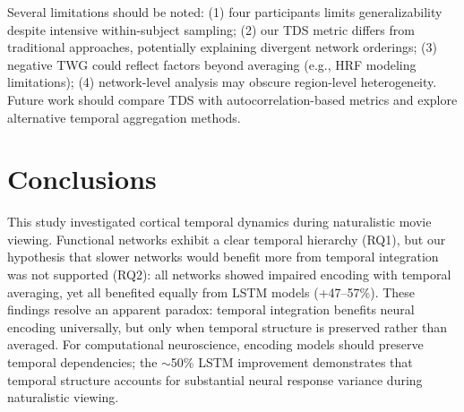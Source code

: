 \documentclass[10pt,letterpaper]{article}
\begin{document}
Several limitations should be noted: (1) four participants limits generalizability despite intensive within-subject sampling; (2) our TDS metric differs from traditional approaches, potentially explaining divergent network orderings; (3) negative TWG could reflect factors beyond averaging (e.g., HRF modeling limitations); (4) network-level analysis may obscure region-level heterogeneity. Future work should compare TDS with autocorrelation-based metrics and explore alternative temporal aggregation methods.



\section{Conclusions}

This study investigated cortical temporal dynamics during naturalistic movie viewing. Functional networks exhibit a clear temporal hierarchy (RQ1), but our hypothesis that slower networks would benefit more from temporal integration was not supported (RQ2): all networks showed impaired encoding with temporal averaging, yet all benefited equally from LSTM models (+47--57\%). These findings resolve an apparent paradox: temporal integration benefits neural encoding universally, but only when temporal structure is preserved rather than averaged. For computational neuroscience, encoding models should preserve temporal dependencies; the $\sim$50\% LSTM improvement demonstrates that temporal structure accounts for substantial neural response variance during naturalistic viewing.



\printbibliography
\end{document}
